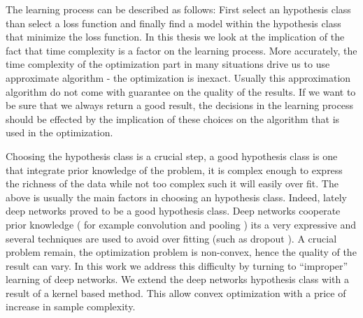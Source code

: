 The learning process can be described as follows: First select an hypothesis class than select a loss function  and finally find a model within  the hypothesis class that minimize the loss function.
In this thesis we look at the implication of the fact that time complexity is a factor on the learning process.
More accurately, the time complexity of the optimization part in many situations drive us to use approximate algorithm - the optimization is inexact.
Usually this approximation algorithm do not come with guarantee on the quality of the results.
If we want to be sure that we always return a good result, the decisions in the learning process should be effected by the implication of these choices on the algorithm that is used in the optimization.

Choosing the hypothesis class is a crucial step, a good hypothesis class is one that integrate prior knowledge of the problem,  it is complex enough to express the richness of the data while not too complex such it will easily over fit.
The above is usually the main factors in choosing an hypothesis class.
Indeed, lately deep networks proved to be a good hypothesis class.
Deep networks cooperate prior knowledge ( for example convolution and pooling \cite{lecun1995convolutional}) its a very expressive and several techniques are used to avoid over fitting (such as dropout \cite{srivastava2014dropout}).
A crucial problem remain, the optimization problem is non-convex, hence the quality of the result can vary.
In this work we address this difficulty by turning to ``improper'' learning of deep networks.
We extend the deep networks hypothesis class with a result of a kernel based method.
This allow convex optimization with a price of increase in sample complexity.

